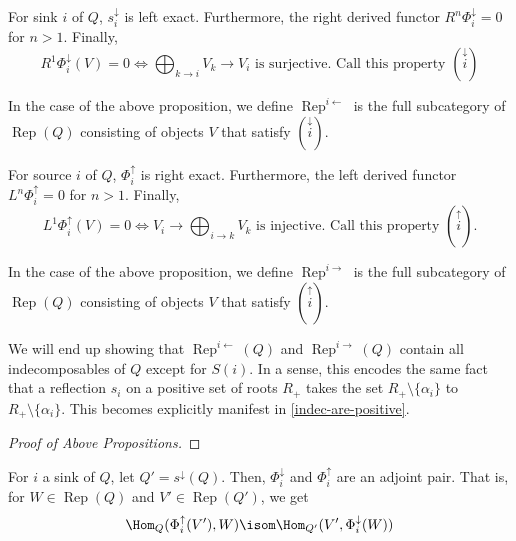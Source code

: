 \documentclass[11pt,leqno,oneside]{amsbook}
\numberwithin{thm}{section}
\newcommand{\Rep}{\operatorname{Rep}} %
\renewcommand{\Q}{Q} %
\newcommand{\sinktosource}{s^\downarrow} %
\newcommand{\sinktosourcefunc}{\Phi^\downarrow} %
\newcommand{\sourcetosinkfunc}{\Phi^\uparrow} %
\renewcommand{\roots}{R} %
\begin{document}
\begin{prop}\label{right-derived-func-is-0}
  For sink \(i\) of \(\Q\), \(\sinktosource_i\) is left
  exact. Furthermore, the right derived functor \(R^n \sinktosourcefunc_i
  = 0\) for \(n > 1\). Finally, \[
    R^1 \sinktosourcefunc_i(V) = 0 \iff \bigoplus_{k \to i} V_k \to V_i
    \text{ is surjective. Call this property }\left(\overset{\downarrow}{i}\right)
  \]
\end{prop}
\begin{defn}
  In the case of the above proposition, we define \(\Rep^{i
    \leftarrow}\) is the full subcategory of \(\Rep(\Q)\) consisting
  of objects \(V\) that satisfy \(\left( \overset{\downarrow}{i} \right)\).
\end{defn}
\begin{prop}
  For source \(i\) of \(\Q\), \(\sourcetosinkfunc_i\) is right
  exact. Furthermore, the left derived functor \(L^n
  \sourcetosinkfunc_i = 0\) for \(n > 1\). Finally, \[
    L^1 \sourcetosinkfunc_i (V) = 0 \iff V_i \to \bigoplus_{i \to k}
    V_k \text{ is injective. Call this property } \left(
      \overset{\uparrow}{i} \right).
  \]
\end{prop}
\begin{defn}
  In the case of the above proposition, we define \(\Rep^{i
    \rightarrow}\) is the full subcategory of \(\Rep(\Q)\) consisting
  of objects \(V\) that satisfy \(\left( \overset{\uparrow}{i} \right)\).
\end{defn}
\begin{rmk}
  We will end up showing that \(\Rep^{i \leftarrow}(\Q)\) and
  \(\Rep^{i \rightarrow}(\Q)\) contain all indecomposables of \(\Q\)
  except for \(S(i)\). In a sense, this encodes the same fact that a
  reflection \(s_i\) on a positive set of roots \(\roots_+\) takes the set
  \(\roots_+ \setminus \{\alpha_i\}\) to \(\roots_+ \setminus
  \{\alpha_i\}\). This becomes explicitly manifest in
  \ref{indec-are-positive}. 
\end{rmk}
\begin{proof}[Proof of Above Propositions]
\end{proof}
\begin{prop} \label{source-sink-adjointness}
  For \(i\) a sink of \(\Q\), let \(\Q' = \sinktosource(\Q)\). Then,
  \(\sinktosourcefunc_i\) and \(\sourcetosinkfunc_i\) are an adjoint
  pair. That is, for \(W \in \Rep(\Q)\) and \(V' \in \Rep(\Q')\), we
  get \[
    \Hom_\Q(\sourcetosinkfunc_i(V'), W) \isom \Hom_{\Q'}(V',
    \sinktosourcefunc_i(W)) 
  \]
\end{prop}
\end{document}
